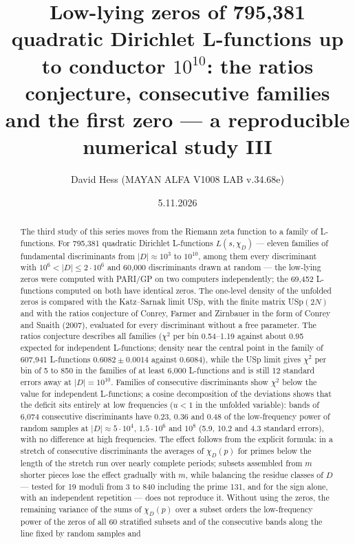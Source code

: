 \documentclass[
  10pt,
]{article}
\title{Low-lying zeros of 795,381 quadratic Dirichlet L-functions up to
conductor \(10^{10}\): the ratios conjecture, consecutive families and
the first zero --- a reproducible numerical study III}
\author{David Hess (MAYAN ALFA V1008 LAB v.34.68e)}
\date{5.11.2026}
\begin{document}
\maketitle
\begin{abstract}
The third study of this series moves from the Riemann zeta function to a
family of L-functions. For 795,381 quadratic Dirichlet L-functions
\(L(s, \chi_D)\) --- eleven families of fundamental discriminants from
\(|D| \approx 10^3\) to \(10^{10}\), among them every discriminant with
\(10^6 < |D| \le 2\cdot10^6\) and 60,000 discriminants drawn at random
--- the low-lying zeros were computed with PARI/GP on two computers
independently; the 69,452 L-functions computed on both have identical
zeros. The one-level density of the unfolded zeros is compared with the
Katz--Sarnak limit USp, with the finite matrix USp\((2N)\) and with the
ratios conjecture of Conrey, Farmer and Zirnbauer in the form of Conrey
and Snaith (2007), evaluated for every discriminant without a free
parameter. The ratios conjecture describes all families (\(\chi^2\) per
bin 0.54--1.19 against about 0.95 expected for independent L-functions;
density near the central point in the family of 607,941 L-functions
\(0.6082 \pm 0.0014\) against \(0.6084\)), while the USp limit gives
\(\chi^2\) per bin of 5 to 850 in the families of at least 6,000
L-functions and is still 12 standard errors away at \(|D| = 10^{10}\).
Families of consecutive discriminants show \(\chi^2\) below the value
for independent L-functions; a cosine decomposition of the deviations
shows that the deficit sits entirely at low frequencies (\(u < 1\) in
the unfolded variable): bands of 6,074 consecutive discriminants have
0.23, 0.36 and 0.48 of the low-frequency power of random samples at
\(|D| \approx 5\cdot10^4\), \(1.5\cdot10^6\) and \(10^8\) (5.9, 10.2 and
4.3 standard errors), with no difference at high frequencies. The effect
follows from the explicit formula: in a stretch of consecutive
discriminants the averages of \(\chi_D(p)\) for primes below the length
of the stretch run over nearly complete periods; subsets assembled from
\(m\) shorter pieces lose the effect gradually with \(m\), while
balancing the residue classes of \(D\) --- tested for 19 moduli from 3
to 840 including the prime 131, and for the sign alone, with an
independent repetition --- does not reproduce it. Without using the
zeros, the remaining variance of the sums of \(\chi_D(p)\) over a subset
orders the low-frequency power of the zeros of all 60 stratified subsets
and of the consecutive bands along the line fixed by random samples and

\end{abstract}
\end{document}
